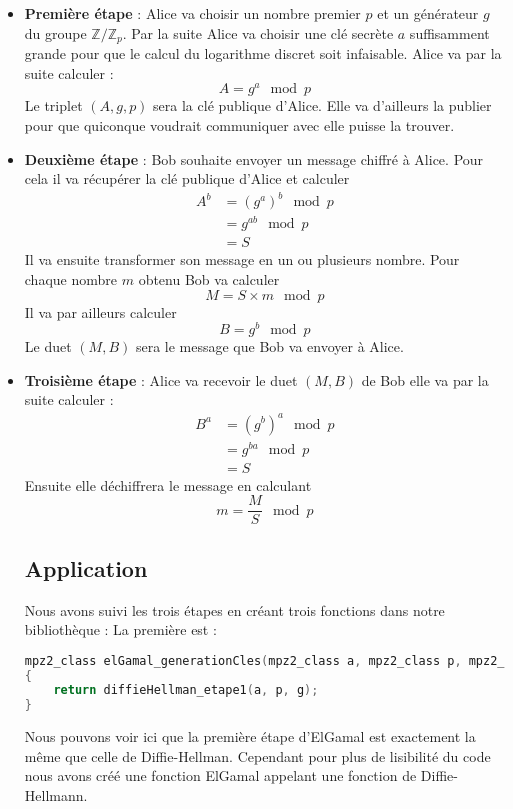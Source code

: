 \begin{itemize}
	\item \textbf{Première étape} : Alice va choisir un nombre premier $p$ et un générateur $g$ du groupe $\mathbb{Z}/\mathbb{Z}_p$. Par la suite Alice va choisir une clé secrète $a$ suffisamment grande pour que le calcul du logarithme discret soit infaisable. Alice va par la suite calculer :
	\[A=g^a \mod p\]
	Le triplet $(A,g,p)$ sera la clé publique d'Alice. Elle va d'ailleurs la publier pour que quiconque voudrait communiquer avec elle puisse la trouver.\\

	\item \textbf{Deuxième étape} : Bob souhaite envoyer un message chiffré à Alice. Pour cela il va récupérer la clé publique d'Alice et calculer 
	\begin{align*}
		A^b&=\left(g^a\right)^b \mod p\\
		&=g^{ab} \mod p \\
		&=S
	\end{align*}
	Il va ensuite transformer son message en un ou plusieurs nombre. Pour chaque nombre $m$ obtenu Bob va calculer
	\[ M=S\times m \mod p \]
	Il va par ailleurs calculer
	\[ B=g^b \mod p \]
	Le duet $(M,B)$ sera le message que Bob va envoyer à Alice.\\

	\item \textbf{Troisième étape} : Alice va recevoir le duet $(M,B)$ de Bob elle va par la suite calculer :
	\begin{align*}
		B^a&=\left(g^b\right)^a \mod p\\
		&=g^{ba} \mod p \\
		&=S
	\end{align*}
	Ensuite elle déchiffrera le message en calculant
	\[ m=\frac{M}{S} \mod p \]

\subsection{Application}

Nous avons suivi les trois étapes en créant trois fonctions dans notre bibliothèque :
La première est : 

\begin{lstlisting}[language=C++]
mpz2_class elGamal_generationCles(mpz2_class a, mpz2_class p, mpz2_class g)
{
	return diffieHellman_etape1(a, p, g);
}
\end{lstlisting}

Nous pouvons voir ici que la première étape d'ElGamal est exactement la même que celle de Diffie-Hellman. Cependant pour plus de lisibilité du code nous avons créé une fonction ElGamal appelant une fonction de Diffie-Hellmann.


\end{itemize}
